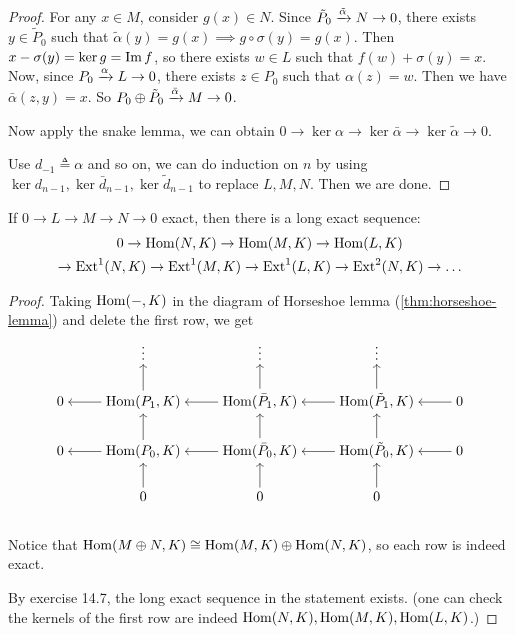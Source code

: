 \begin{theorem}
\begin{proof}
    For any $x \in M$, consider $g(x) \in N$. Since
    $\tilde P_0 \xrightarrow{\tilde \alpha} N \to 0$, there exists $y \in \tilde P_0$
    such that $\tilde\alpha(y) = g(x) \implies g\circ\sigma(y) = g(x)$.
    Then $x - \sigma(y) = \ker g = \operatorname{Im} f$, so there exists $w \in L$
    such that $f(w) + \sigma(y) = x$. Now, since $P_0 \xrightarrow{\alpha} L \to 0$,
    there exists $z \in P_0$ such that $\alpha(z) = w$. Then we have
    $\bar\alpha(z, y) = x$. So $P_0 \oplus \tilde P_0 \xrightarrow{\bar \alpha} M \to 0$.
    
    Now apply the snake lemma, we can obtain
    $
      0 \to \ker \alpha \to \ker \bar \alpha \to \ker \tilde \alpha \to 0.
    $

    Use $d_{-1} \triangleq \alpha$ and so on, we can do induction on $n$ by
    using $\ker d_{n-1}, \ker \bar d_{n-1}, \ker \tilde d_{n-1}$ to replace
    $L, M, N$. Then we are done.
  \end{proof}
\end{theorem}

\begin{theorem}
  If $0 \to L \to M \to N \to 0$ exact, then there is a long exact sequence:
  \begin{multline*} 0 \to \operatorname{Hom}(N, K) \to \operatorname{Hom}(M, K) \to \operatorname{Hom}(L, K) \\
    \to \operatorname{Ext}^1(N, K) \to \operatorname{Ext}^1(M, K) \to \operatorname{Ext}^1(L, K) \to \operatorname{Ext}^2(N, K) \to \dots
  \end{multline*}

  \begin{proof}
    Taking $\operatorname{Hom}({-}, K)$ in the diagram of Horseshoe lemma
    (\ref{thm:horseshoe-lemma}) and delete the first row,
    we get
  \[ \begin{tikzcd}[cramped]
      & \vdots \ar[leftarrow, d] & \vdots \ar[leftarrow, d] & \vdots \ar[leftarrow, d] & \\
      0 \ar[leftarrow, r] & \Hom(P_1, K) \ar[leftarrow, r] \ar[leftarrow, d] & \Hom(\bar P_1, K) \ar[leftarrow, r] \ar[leftarrow, d] & \Hom(\tilde P_1, K) \ar[leftarrow, r] \ar[leftarrow, d] & 0 \\
      0 \ar[leftarrow, r] & \Hom(P_0, K) \ar[leftarrow, r] \ar[leftarrow, d] & \Hom(\bar P_0, K) \ar[leftarrow, r] \ar[leftarrow, d] & \Hom(\tilde P_0, K) \ar[leftarrow, r] \ar[leftarrow, d] & 0 \\
      & 0 & 0 & 0 & \\
     \end{tikzcd} \]
   Notice that $\operatorname{Hom}(M \oplus N, K) \cong \operatorname{Hom}(M, K) \oplus \operatorname{Hom}(N, K)$, so
   each row is indeed exact.

   By exercise 14.7, the long exact sequence in the statement exists.
   (one can check the kernels of the first row are indeed
   $\operatorname{Hom}(N, K), \operatorname{Hom}(M, K), \operatorname{Hom}(L, K)$.)
  \end{proof}
\end{theorem}

